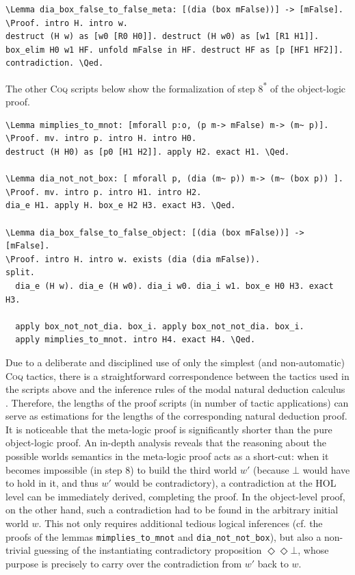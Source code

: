 \documentclass{llncs}
\newcommand{\red}[1]{\textcolor[rgb]{1,0,0}{#1}}
\newcommand{\blue}[1]{\textcolor[rgb]{0,0,1}{#1}}
\newcommand{\Lemma}{\red{Lemma}}
\newcommand{\Proof}{\blue{Proof}}
\newcommand{\Qed}{\blue{Qed}}
\newcommand{\verbsize}{\small}
\newcommand{\Dia}{\Diamond} %
\newcommand{\pos}{\Dia}
\begin{document}
\begin{Verbatim}[commandchars=\\\{\},fontsize=\verbsize]
\Lemma dia_box_false_to_false_meta: [(dia (box mFalse))] -> [mFalse].
\Proof. intro H. intro w.
destruct (H w) as [w0 [R0 H0]]. destruct (H w0) as [w1 [R1 H1]].
box_elim H0 w1 HF. unfold mFalse in HF. destruct HF as [p [HF1 HF2]].
contradiction. \Qed.
\end{Verbatim}

\noindent
The other \textsc{Coq} scripts below show the formalization of step 8\textsuperscript{*} of the object-logic proof.

\begin{Verbatim}[commandchars=\\\{\},fontsize=\verbsize]
\Lemma mimplies_to_mnot: [mforall p:o, (p m-> mFalse) m-> (m~ p)].
\Proof. mv. intro p. intro H. intro H0. 
destruct (H H0) as [p0 [H1 H2]]. apply H2. exact H1. \Qed.

\Lemma dia_not_not_box: [ mforall p, (dia (m~ p)) m-> (m~ (box p)) ].
\Proof. mv. intro p. intro H1. intro H2. 
dia_e H1. apply H. box_e H2 H3. exact H3. \Qed.

\Lemma dia_box_false_to_false_object: [(dia (box mFalse))] -> [mFalse].
\Proof. intro H. intro w. exists (dia (dia mFalse)).
split.
  dia_e (H w). dia_e (H w0). dia_i w0. dia_i w1. box_e H0 H3. exact H3.

  apply box_not_not_dia. box_i. apply box_not_not_dia. box_i.
  apply mimplies_to_mnot. intro H4. exact H4. \Qed.
\end{Verbatim}

\noindent
Due to a deliberate and disciplined use of only 
the simplest (and non-automatic) \textsc{Coq} tactics, 
there is a straightforward correspondence between the tactics used 
in the scripts above and the inference rules of the modal natural 
deduction calculus \cite{CSR}. Therefore, the lengths of the proof 
scripts (in number of tactic applications) can serve as estimations 
for the lengths of the corresponding natural deduction proof. 
It is noticeable that the meta-logic proof is significantly shorter 
than the pure object-logic proof. An in-depth analysis 
reveals that the reasoning about the possible worlds semantics in 
the meta-logic proof acts as a short-cut: when it becomes impossible (in step 8) to build the third world $w'$ (because $\bot$ would have to hold in it, and thus $w'$ would be contradictory), a contradiction at the HOL level can be immediately derived, completing the proof. In the object-level proof, on the other hand, such a contradiction had to be found in the arbitrary initial world $w$. This not only requires additional tedious logical inferences (cf. the proofs of the lemmas \texttt{mimplies\_to\_mnot} and \texttt{dia\_not\_not\_box}), but also a non-trivial guessing of the instantiating contradictory proposition $\pos \pos \bot$, whose purpose is precisely to carry over the contradiction from $w'$ back to $w$.
\end{document}
